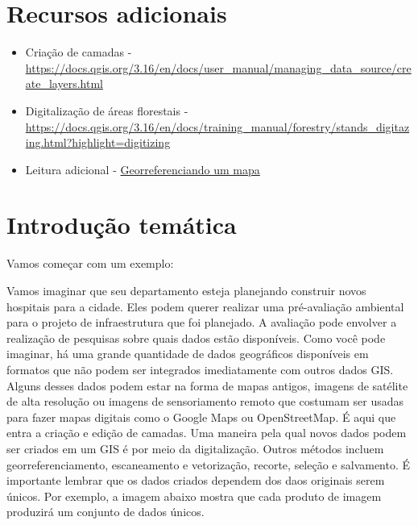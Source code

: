 \documentclass[
]{book}
\providecommand{\tightlist}{%
  \setlength{\itemsep}{0pt}\setlength{\parskip}{0pt}}
\begin{document}
\hypertarget{recursos-adicionais-7}{%
\section{Recursos adicionais}\label{recursos-adicionais-7}}

\begin{itemize}
\tightlist
\item
  Criação de camadas - \url{https://docs.qgis.org/3.16/en/docs/user_manual/managing_data_source/create_layers.html}
\item
  Digitalização de áreas florestais - \href{https://docs.\%20qgis.org/3.16/en/docs/training_manual/forestry/stands_digitazing.html?highlight=digitizing}{https://docs.qgis.org/3.16/en/docs/training\_manual/forestry/stands\_digitazing.html?highlight=digitizing}
\item
  Leitura adicional - \href{https://docs.qgis.org/3.16/en/docs/training_manual/forestry/map_georeferencing.html?highlight=georeferencing}{Georreferenciando um mapa}
\end{itemize}

\hypertarget{introduuxe7uxe3o-temuxe1tica-7}{%
\section{Introdução temática}\label{introduuxe7uxe3o-temuxe1tica-7}}

Vamos começar com um exemplo:

Vamos imaginar que seu departamento esteja planejando construir novos hospitais para a cidade. Eles podem querer realizar uma pré-avaliação ambiental para o projeto de infraestrutura que foi planejado. A avaliação pode envolver a realização de pesquisas sobre quais dados estão disponíveis. Como você pode imaginar, há uma grande quantidade de dados geográficos disponíveis em formatos que não podem ser integrados imediatamente com outros dados GIS. Alguns desses dados podem estar na forma de mapas antigos, imagens de satélite de alta resolução ou imagens de sensoriamento remoto que costumam ser usadas para fazer mapas digitais como o Google Maps ou OpenStreetMap. É aqui que entra a criação e edição de camadas. Uma maneira pela qual novos dados podem ser criados em um GIS é por meio da digitalização. Outros métodos incluem georreferenciamento, escaneamento e vetorização, recorte, seleção e salvamento. É importante lembrar que os dados criados dependem dos daos originais serem únicos. Por exemplo, a imagem abaixo mostra que cada produto de imagem produzirá um conjunto de dados únicos.
\end{document}
